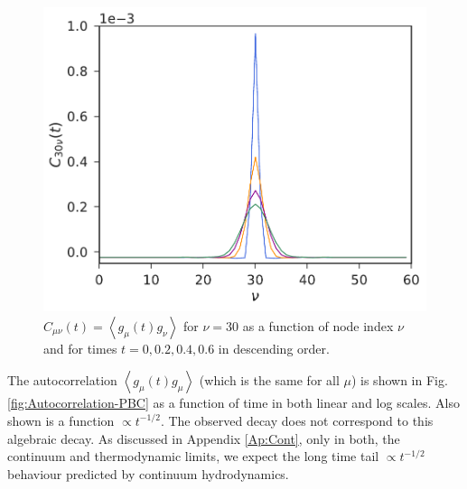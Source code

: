 \documentclass[a4paper,openright,12pt]{book}
\newcommand{\llangle}{\left\langle}
\newcommand{\rrangle}{\right\rangle}
\begin{document}
\begin{figure}[h!]
\centering
\includegraphics[scale=0.45]{Ct-mu30nu-PBC}
\caption[$C_{30\nu}(t)$ for PBC system.]{$C_{\mu\nu}(t)=\llangle  g_{\mu}(t) g_\nu\rrangle$  for $\nu=30$
 as a  function of node index  $\nu$ and for times $t=0, 0.2, 0.4, 0.6$ in descending order.}
 \label{fig:Ct-mu30nu-PBC} 
\end{figure}

The autocorrelation $\llangle  g_{\mu}(t) g_\mu\rrangle$ (which is
the same for  all $\mu$) is shown in  Fig.  \ref{fig:Autocorrelation-PBC}
as a function of time in both  linear and log scales.  Also shown is a
function $\propto  t^{-1/2}$.  The observed decay  does not correspond
to this algebraic decay.  As discussed in Appendix \ref{Ap:Cont}, only
in both,  the continuum and  thermodynamic limits, we expect  the long
time  tail   $\propto  t^{-1/2}$  behaviour  predicted   by  continuum
hydrodynamics.
\end{document}
